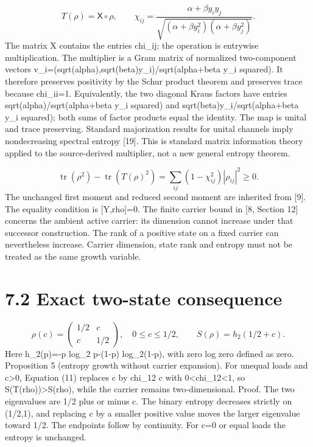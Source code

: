 \documentclass[11pt,a4paper]{article}
\begin{document}
\begin{equation}T(\rho)=\mathsf{X}\circ\rho,\qquad\chi_{ij}=\frac{\alpha+\beta y_i y_j}{\sqrt{(\alpha+\beta y_i^2)(\alpha+\beta y_j^2)}}.\tag{11}\end{equation}
The matrix X contains the entries chi\_ij; the operation is entrywise multiplication. The multiplier is a Gram matrix of normalized two-component vectors v\_i=(sqrt(alpha),sqrt(beta)y\_i)/sqrt(alpha+beta y\_i squared). It therefore preserves positivity by the Schur product theorem and preserves trace because chi\_ii=1. Equivalently, the two diagonal Kraus factors have entries sqrt(alpha)/sqrt(alpha+beta y\_i squared) and sqrt(beta)y\_i/sqrt(alpha+beta y\_i squared); both sums of factor products equal the identity. The map is unital and trace preserving. Standard majorization results for unital channels imply nondecreasing spectral entropy [19]. This is standard matrix information theory applied to the source-derived multiplier, not a new general entropy theorem.

\begin{equation}\operatorname{tr}(\rho^2)-\operatorname{tr}(T(\rho)^2)=\sum_{ij}(1-\chi_{ij}^2)|\rho_{ij}|^2\ge0.\tag{12}\end{equation}
The unchanged first moment and reduced second moment are inherited from [9]. The equality condition is [Y,rho]=0. The finite carrier bound in [8, Section 12] concerns the ambient active carrier: its dimension cannot increase under that successor construction. The rank of a positive state on a fixed carrier can nevertheless increase. Carrier dimension, state rank and entropy must not be treated as the same growth variable.

\section*{7.2 Exact two-state consequence}
\begin{equation}\rho(c)=\begin{pmatrix}1/2&c\\c&1/2\end{pmatrix},\quad0\le c\le1/2,\qquad S(\rho)=h_2(1/2+c).\tag{13}\end{equation}
Here h\_2(p)=-p log\_2 p-(1-p) log\_2(1-p), with zero log zero defined as zero. Proposition 5 (entropy growth without carrier expansion). For unequal loads and c>0, Equation (11) replaces c by chi\_12 c with 0<chi\_12<1, so S(T(rho))>S(rho), while the carrier remains two-dimensional. Proof. The two eigenvalues are 1/2 plus or minus c. The binary entropy decreases strictly on (1/2,1), and replacing c by a smaller positive value moves the larger eigenvalue toward 1/2. The endpoints follow by continuity. For c=0 or equal loads the entropy is unchanged.
\end{document}
